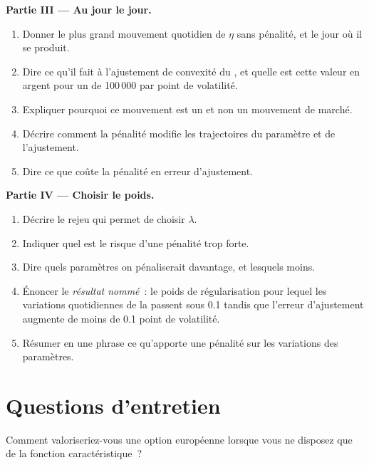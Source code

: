 \begin{problem}
\medskip\noindent\textbf{Partie III --- Au jour le jour.}
\begin{enumerate}[resume]
\item Donner le plus grand mouvement quotidien de $\eta$ sans pénalité, et le jour où il se produit.
\item Dire ce qu'il fait à l'ajustement de convexité du , et quelle est cette valeur en argent pour un  de 100\,000 par point de volatilité.
\item Expliquer pourquoi ce mouvement est un  et non un mouvement de marché.
\item Décrire comment la pénalité modifie les trajectoires du paramètre et de l'ajustement.
\item Dire ce que coûte la pénalité en erreur d'ajustement.
\end{enumerate}

\medskip\noindent\textbf{Partie IV --- Choisir le poids.}
\begin{enumerate}[resume]
\item Décrire le rejeu qui permet de choisir $\lambda$.
\item Indiquer quel est le risque d'une pénalité trop forte.
\item Dire quels paramètres on pénaliserait davantage, et lesquels moins.
\item Énoncer le \emph{résultat nommé}~: le poids de régularisation pour lequel les variations quotidiennes de la  passent sous 0.1 tandis que
l'erreur d'ajustement augmente de moins de 0.1 point de volatilité.
\item Résumer en une phrase ce qu'apporte une pénalité sur les variations des paramètres.
\end{enumerate}
\end{problem}

\section{Questions d'entretien}

\begin{interviewq}\label{iq:dv:fourier-pricing-and-calibration-engineering:1}
Comment valoriseriez-vous une option européenne lorsque vous ne disposez que de la fonction caractéristique~?
\end{interviewq}

